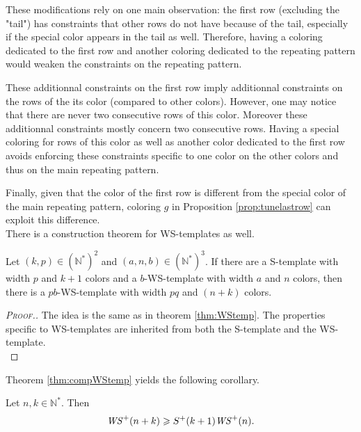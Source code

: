 \par
These modifications rely on one main observation: the first row (excluding the "tail") has constraints that other rows do not 
have because of the tail, especially if the special color appears in the tail as well. Therefore, having a coloring dedicated to 
the first row and another coloring dedicated to the repeating pattern would weaken the constraints on the repeating pattern. 

\par
These additionnal constraints on the first row imply additionnal constraints on the rows of the its color (compared to other 
colors). However, one may notice that there are never two consecutive rows of this color. Moreover these additionnal constraints 
mostly concern two consecutive rows. Having a special coloring for rows of this color as well as another color dedicated to the 
first row avoids enforcing these constraints specific to one color on the other colors and thus on the main repeating pattern.

\par
Finally, given that the color of the first row is different from the special color of the main repeating pattern, coloring \(g\) in
Proposition \ref{prop:tunelastrow} can exploit this difference. \\

There is a construction theorem for WS-templates as well.

\begin{theorem}
\label{thm:compWStemp}
Let \((k,p) \in (\mathbb{N}^*)^2\) and \((a, n, b) \in (\mathbb{N}^*)^3\). If there are a S-template with width
\(p\) and \(k+1\) colors and a \(b\)-WS-template with width \(a\) and \(n\) colors, then there is a \(pb\)-WS-template
with width \(pq\) and \((n+k)\) colors.
\end{theorem}

\begin{proof}[\textsc{Proof.}]
The idea is the same as in theorem \ref{thm:WStemp}. The properties specific to WS-templates are inherited 
from both the S-template and the WS-template. \\
\end{proof}

Theorem \ref{thm:compWStemp} yields the following corollary.

\begin{corollary}
Let \(n, k \in \mathbb{N}^*\). Then
\[
\mathit{WS}^+(n+k) \geqslant S^+(k+1) \mathit{WS}^+(n).
\]
\end{corollary}

